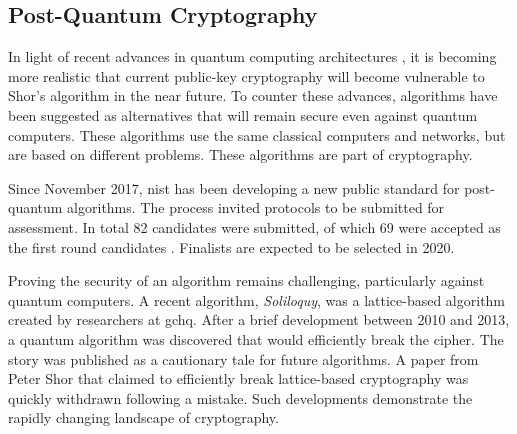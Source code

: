 
\subsection{Post-Quantum Cryptography}

In light of recent advances in quantum computing architectures \cite{arute2019quantum}, it is becoming more realistic that current public-key cryptography will become vulnerable to Shor's algorithm \cite{shor1994} in the near future. To counter these advances,  algorithms have been suggested as alternatives that will remain secure even against quantum computers. These algorithms use the same classical computers and networks, but are based on different problems. These algorithms are part of  cryptography.

Since November 2017, \ac{nist} has been developing a new public standard for post-quantum algorithms. The process invited protocols to be submitted for assessment. In total 82 candidates were submitted, of which 69 were accepted as the first round candidates \cite{alagic2019status}. Finalists are expected to be selected in 2020.

Proving the security of an algorithm remains challenging, particularly against quantum computers. A recent algorithm, \textit{Soliloquy}, was a lattice-based algorithm created by researchers at \ac{gchq}. After a brief development between 2010 and 2013, a quantum algorithm was discovered that would efficiently break the cipher. The story was published as a cautionary tale for future algorithms. A paper from Peter Shor that claimed to efficiently break lattice-based cryptography was quickly withdrawn following a mistake\cite{eldar2016efficient}. Such developments demonstrate the rapidly changing landscape of cryptography.



